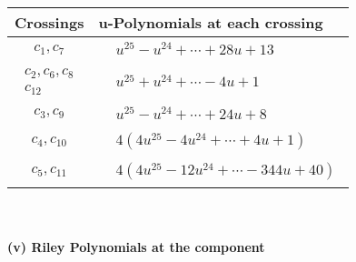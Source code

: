 \documentclass[1p]{elsarticle_modified}
\theoremstyle{definition}
\begin{document}
\begin{tabular}{m{50pt}|m{274pt}}
Crossings & \hspace{64pt}u-Polynomials at each crossing \\
\hline $$\begin{aligned}c_{1},c_{7}\end{aligned}$$&$\begin{aligned}
&u^{25}- u^{24}+\cdots+28 u+13
\end{aligned}$\\
\hline $$\begin{aligned}c_{2},c_{6},c_{8}\\c_{12}\end{aligned}$$&$\begin{aligned}
&u^{25}+u^{24}+\cdots-4 u+1
\end{aligned}$\\
\hline $$\begin{aligned}c_{3},c_{9}\end{aligned}$$&$\begin{aligned}
&u^{25}- u^{24}+\cdots+24 u+8
\end{aligned}$\\
\hline $$\begin{aligned}c_{4},c_{10}\end{aligned}$$&$\begin{aligned}
&4(4 u^{25}-4 u^{24}+\cdots+4 u+1)
\end{aligned}$\\
\hline $$\begin{aligned}c_{5},c_{11}\end{aligned}$$&$\begin{aligned}
&4(4 u^{25}-12 u^{24}+\cdots-344 u+40)
\end{aligned}$\\
\hline
\end{tabular}\\~\\
\newpage\renewcommand{\arraystretch}{1}
\flushleft \textbf{(v) Riley Polynomials at the component}\newline \\
\end{document}
